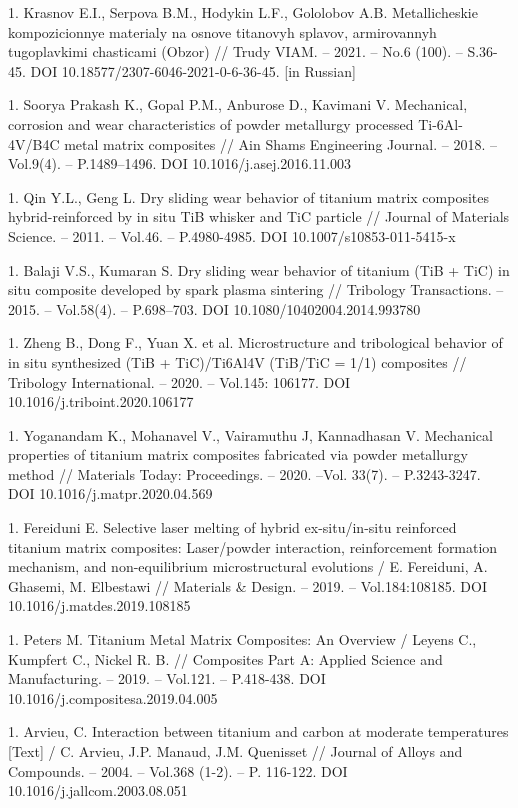 1. Krasnov E.I., Serpova B.M., Hodykin L.F., Gololobov A.B.
Metallicheskie kompozicionnye materialy na osnove titanovyh splavov,
armirovannyh tugoplavkimi chasticami (Obzor) // Trudy VIAM. -- 2021.
-- No.6 (100). -- S.36-45. DOI 10.18577/2307-6046-2021-0-6-36-45.
{[}in Russian{]}

1. Soorya Prakash K., Gopal P.M., Anburose D., Kavimani V. Mechanical,
corrosion and wear characteristics of powder metallurgy processed
Ti-6Al-4V/B4C metal matrix composites // Ain Shams Engineering
Journal. -- 2018. -- Vol.9(4). -- P.1489--1496. DOI
10.1016/j.asej.2016.11.003

1. Qin Y.L., Geng L. Dry sliding wear behavior of titanium matrix
composites hybrid-reinforced by in situ TiB whisker and TiC particle
// Journal of Materials Science. -- 2011. -- Vol.46. -- P.4980-4985.
DOI 10.1007/s10853-011-5415-x

1. Balaji V.S., Kumaran S. Dry sliding wear behavior of titanium (TiB +
TiC) in situ composite developed by spark plasma sintering //
Tribology Transactions. -- 2015. -- Vol.58(4). -- P.698--703. DOI
10.1080/10402004.2014.993780

1. Zheng B., Dong F., Yuan X. et al. Microstructure and tribological
behavior of in situ synthesized (TiB + TiC)/Ti6Al4V (TiB/TiC = 1/1)
composites // Tribology International. -- 2020. -- Vol.145: 106177.
DOI 10.1016/j.triboint.2020.106177

1. Yoganandam K., Mohanavel V., Vairamuthu J, Kannadhasan V. Mechanical
properties of titanium matrix composites fabricated via powder
metallurgy method // Materials Today: Proceedings. -- 2020. --Vol.
33(7). -- P.3243-3247. DOI 10.1016/j.matpr.2020.04.569

1. Fereiduni E. Selective laser melting of hybrid ex-situ/in-situ
reinforced titanium matrix composites: Laser/powder interaction,
reinforcement formation mechanism, and non-equilibrium microstructural
evolutions / E. Fereiduni, A. Ghasemi, M. Elbestawi // Materials \&
Design. -- 2019. -- Vol.184:108185. DOI 10.1016/j.matdes.2019.108185

1. Peters M. Titanium Metal Matrix Composites: An Overview / Leyens C.,
Kumpfert C., Nickel R. B. // Composites Part A: Applied Science and
Manufacturing. -- 2019. -- Vol.121. -- P.418-438. DOI
10.1016/j.compositesa.2019.04.005

1. Arvieu, C. Interaction between titanium and carbon at moderate
temperatures {[}Text{]} / C. Arvieu, J.P. Manaud, J.M. Quenisset //
Journal of Alloys and Compounds. -- 2004. -- Vol.368 (1-2). -- P.
116-122. DOI 10.1016/j.jallcom.2003.08.051

